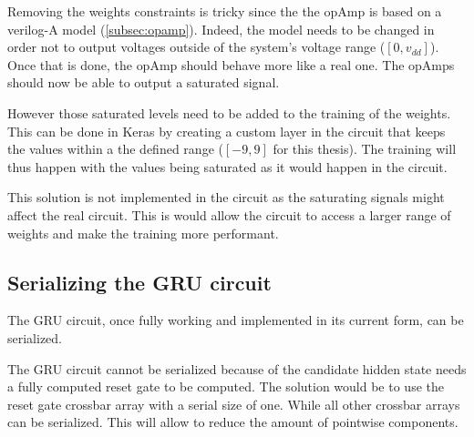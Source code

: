 Removing the weights constraints is tricky since the the \ac{opAmp} is based on a verilog-A model (\cref{subsec:opamp}). Indeed, the model needs to be changed in order not to output voltages outside of the system's voltage range ($[0,v_{dd}]$). Once that is done, the \ac{opAmp} should behave more like a real one. The \acp{opAmp} should now be able to output a saturated signal.

However those saturated levels need to be added to the training of the weights. This can be done in Keras by creating a custom layer in the circuit that keeps the values within a the defined range ($[-9,9]$ for this thesis). The training will thus happen with the values being saturated as it would happen in the circuit.

This solution is not implemented in the circuit as the saturating signals might affect the real circuit. This is would allow the circuit to access a larger range of weights and make the training more performant.

\subsection{Serializing the \acs{GRU} circuit}

The \ac{GRU} circuit, once fully working and implemented in its current form, can be serialized.

The \ac{GRU} circuit cannot be serialized because of the candidate hidden state needs a fully computed reset gate to be computed. The solution would be to use the reset gate crossbar array with a serial size of one. While all other crossbar arrays can be serialized. This will allow to reduce the amount of pointwise components.
